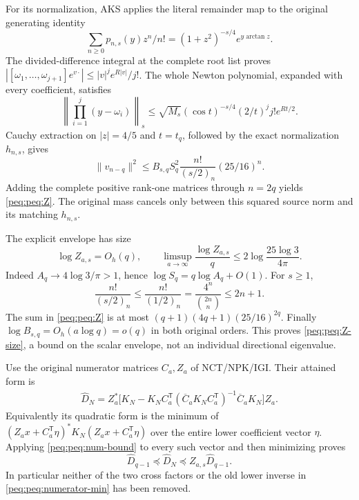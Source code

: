 \documentclass[11pt,a4paper]{article}
\begin{document}
For its normalization, AKS applies the literal remainder map to the original generating identity
\[
 \sum_{n\ge0}p_{n,s}(y)z^n/n!
       =(1+z^2)^{-s/4}e^{y\arctan z}.
\]
The divided-difference integral at the complete root list proves
$|[\omega_1,\ldots,\omega_{j+1}]e^{v\cdot}|\le |v|^je^{R|v|}/j!$.
The whole Newton polynomial, expanded with every coefficient, satisfies
\[
 \left\|\prod_{i=1}^j(y-\omega_i)\right\|_s
 \le\sqrt{M_s}(\cos t)^{-s/4}(2/t)^j j!e^{Rt/2}.
\]
Cauchy extraction on $|z|=4/5$ and $t=t_q$, followed by the exact normalization $h_{n,s}$, gives
\[
 \|v_{n-q}\|^2\le
 B_{s,q}S_q^2\frac{n!}{(s/2)_n}(25/16)^n.
\]
Adding the complete positive rank-one matrices through $n=2q$ yields \eqref{peq:peq:Z}. The original mass cancels only between this squared source norm and its matching $h_{n,s}$.

The explicit envelope has size
\begin{equation}
 \log Z_{a,s}=O_h(q),\qquad
 \limsup_{a\to\infty}\frac{\log Z_{a,s}}q
 \le2\log\frac{25\log3}{4\pi}.
 \label{peq:peq:Z-size}
\end{equation}
Indeed $A_q\to4\log3/\pi>1$, hence $\log S_q=q\log A_q+O(1)$. For $s\ge1$,
\[
 \frac{n!}{(s/2)_n}\le\frac{n!}{(1/2)_n}
 =\frac{4^n}{\binom{2n}{n}}\le2n+1.
\]
The sum in \eqref{peq:peq:Z} is at most $(q+1)(4q+1)(25/16)^{2q}$. Finally $\log B_{s,q}=O_h(a\log q)=o(q)$ in both original orders. This proves \eqref{peq:peq:Z-size}, a bound on the scalar envelope, not an individual directional eigenvalue.

Use the original numerator matrices $C_a,Z_a$ of NCT/NPK/IGI. Their attained form is
\begin{equation}
\begin{split}
 \widehat D_N=Z_a^*\bigl[ K_N-K_NC_a^{\mathsf T}
 (\overline C_aK_NC_a^{\mathsf T})^{-1}
                  \overline C_aK_N\bigr]Z_a.
\end{split}\label{peq:peq:numerator-min}
\end{equation}
Equivalently its quadratic form is the minimum of
$(Z_ax+C_a^{\mathsf T}\eta)^*K_N(Z_ax+C_a^{\mathsf T}\eta)$ over the entire lower coefficient vector $\eta$. Applying \eqref{peq:peq:num-bound} to every such vector and then minimizing proves
\begin{equation}
 \widehat D_{q-1}\preceq\widehat D_N
                  \preceq Z_{a,s}\widehat D_{q-1}.
 \label{peq:peq:numerator-order}
\end{equation}
In particular neither of the two cross factors or the old lower inverse in \eqref{peq:peq:numerator-min} has been removed.
\end{document}
